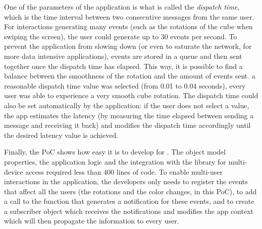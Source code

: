 One of the parameters of the application is what is called the \emph{dispatch time}, which is the time interval between two consecutive messages from the same user. For interactions generating many events (such as the rotations of the cube when swiping the screen), the user could generate up to 30 events per second. To prevent the application from slowing down (or even to saturate the network, for more data intensive applications), events are stored in a queue and then sent together once the dispatch time has elapsed. This way, it is possible to find a balance between the smoothness of the rotation and the amount of events sent. a reasonable dispatch time value was selected (from 0.01 to 0.04 seconds), every user was able to experience a very smooth cube rotation. The dispatch time could also be set automatically by the application: if the user does not select a value, the app estimates the latency (by measuring the time elapsed between sending a message and receiving it back) and modifies the dispatch time accordingly until the desired latency value is achieved. 

Finally, the PoC shows how easy it is to develop for \arch{}. The object model properties, the application logic and the integration with the library for multi-device access required less than 400 lines of code. To enable multi-user interactions in the application, the developers only needs to register the events that affect all the users (the rotations and the color changes, in this PoC), to add a call to the function that generates a notification for these events, and to create a subscriber object which receives the notifications and modifies the app context which will then propagate the information to every user.

